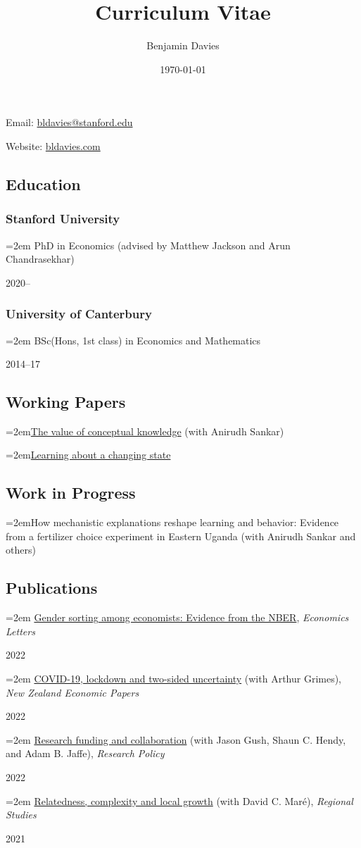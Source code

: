 \documentclass[11pt,oneside]{memoir}
\title{Curriculum Vitae}
\author{Benjamin Davies}
\date{\today}
\newcommand{\entry}[1]{\par\hangindent=2em#1}
\newcommand{\datedentry}[2]{\par\parbox[t]{0.9\linewidth}{\strut\raggedright\hangindent=2em #2\strut}\hfill#1}
\begin{document}
\chapter{\theauthor}

Email: \href{mailto:bldavies@stanford.edu}{bldavies@stanford.edu}

Website: \href{https://bldavies.com}{bldavies.com}

\section{Education}

\subsection{Stanford University}
\datedentry{2020--}{PhD in Economics (advised by Matthew Jackson and Arun Chandrasekhar)}

\subsection{University of Canterbury}
\datedentry{2014--17}{BSc(Hons, 1st class) in Economics and Mathematics}

\section{Working Papers}

\entry{\href{https://arxiv.org/abs/2509.09170}{The value of conceptual knowledge} (with Anirudh Sankar)}
\entry{\href{https://arxiv.org/abs/2401.03607}{Learning about a changing state}}


\section{Work in Progress}

\entry{How mechanistic explanations reshape learning and behavior: Evidence from a fertilizer choice experiment in Eastern Uganda (with Anirudh Sankar and others)}


\section{Publications}

\datedentry{2022}{\href{https://doi.org/10.1016/j.econlet.2022.110640}{Gender sorting among economists: Evidence from the NBER}, \emph{Economics Letters}}
\datedentry{2022}{\href{https://doi.org/10.1080/00779954.2020.1806340}{COVID-19, lockdown and two-sided uncertainty} (with Arthur Grimes), \emph{New Zealand Economic Papers}}
\datedentry{2022}{\href{https://doi.org/10.1016/j.respol.2021.104421}{Research funding and collaboration} (with Jason Gush, Shaun C. Hendy, and Adam B. Jaffe), \emph{Research Policy}}
\datedentry{2021}{\href{https://doi.org/10.1080/00343404.2020.1802418}{Relatedness, complexity and local growth} (with David C. Maré), \emph{Regional Studies}}
\end{document}
